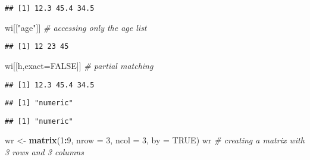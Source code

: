 \documentclass[
]{article}
\newenvironment{Shaded}{\begin{snugshade}}{\end{snugshade}}
\newcommand{\AttributeTok}[1]{\textcolor[rgb]{0.13,0.29,0.53}{#1}}
\newcommand{\CommentTok}[1]{\textcolor[rgb]{0.56,0.35,0.01}{\textit{#1}}}
\newcommand{\ConstantTok}[1]{\textcolor[rgb]{0.56,0.35,0.01}{#1}}
\newcommand{\DecValTok}[1]{\textcolor[rgb]{0.00,0.00,0.81}{#1}}
\newcommand{\FunctionTok}[1]{\textcolor[rgb]{0.13,0.29,0.53}{\textbf{#1}}}
\newcommand{\NormalTok}[1]{#1}
\newcommand{\OtherTok}[1]{\textcolor[rgb]{0.56,0.35,0.01}{#1}}
\newcommand{\SpecialCharTok}[1]{\textcolor[rgb]{0.81,0.36,0.00}{\textbf{#1}}}
\newcommand{\StringTok}[1]{\textcolor[rgb]{0.31,0.60,0.02}{#1}}
\begin{document}
\begin{verbatim}
## [1] 12.3 45.4 34.5
\end{verbatim}

\begin{Shaded}
\begin{Highlighting}[]
\NormalTok{wi[[}\StringTok{"age"}\NormalTok{]] }\CommentTok{\# accessing only the age list}
\end{Highlighting}
\end{Shaded}

\begin{verbatim}
## [1] 12 23 45
\end{verbatim}

\begin{Shaded}
\begin{Highlighting}[]
\NormalTok{wi[[}\StringTok{\textquotesingle{}h\textquotesingle{}}\NormalTok{,exact}\OtherTok{=}\ConstantTok{FALSE}\NormalTok{]] }\CommentTok{\# partial matching}
\end{Highlighting}
\end{Shaded}

\begin{verbatim}
## [1] 12.3 45.4 34.5
\end{verbatim}

\begin{Shaded}
\end{Shaded}

\begin{verbatim}
## [1] "numeric"
\end{verbatim}

\begin{Shaded}
\end{Shaded}

\begin{verbatim}
## [1] "numeric"
\end{verbatim}

\begin{Shaded}
\begin{Highlighting}[]
\NormalTok{wr }\OtherTok{\textless{}{-}} \FunctionTok{matrix}\NormalTok{(}\DecValTok{1}\SpecialCharTok{:}\DecValTok{9}\NormalTok{, }\AttributeTok{nrow =} \DecValTok{3}\NormalTok{, }\AttributeTok{ncol =} \DecValTok{3}\NormalTok{, }\AttributeTok{by =} \ConstantTok{TRUE}\NormalTok{)}
\NormalTok{wr }\CommentTok{\# creating a matrix with 3 rows and 3 columns}
\end{Highlighting}
\end{Shaded}
\end{document}
